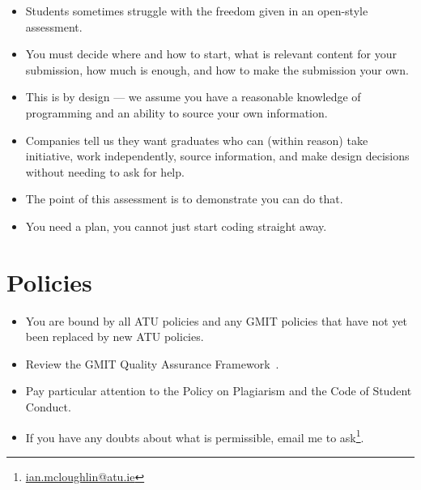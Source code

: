 \documentclass[a4paper]{tufte-handout}
\begin{document}
\begin{itemize}
  \item Students sometimes struggle with the freedom given in an open-style assessment.
  \item You must decide where and how to start, what is relevant content for your submission, how much is enough, and how to make the submission your own.
  \item This is by design --- we assume you have a reasonable knowledge of programming and an ability to source your own information.
  \item Companies tell us they want graduates who can (within reason) take initiative, work independently, source information, and make design decisions without needing to ask for help.
  \item The point of this assessment is to demonstrate you can do that.
  \item You need a plan, you cannot just start coding straight away.
\end{itemize}


\section{Policies}

\begin{itemize}
  \item You are bound by all ATU policies and any GMIT policies that have not yet been replaced by new ATU policies.
  \item Review the GMIT Quality Assurance Framework~\cite{gmitqaf}.
  \item Pay particular attention to the Policy on Plagiarism and the Code of Student Conduct.
  \item If you have any doubts about what is permissible, email me to ask\footnote{\url{ian.mcloughlin@atu.ie}}.
\end{itemize}



\end{document}
